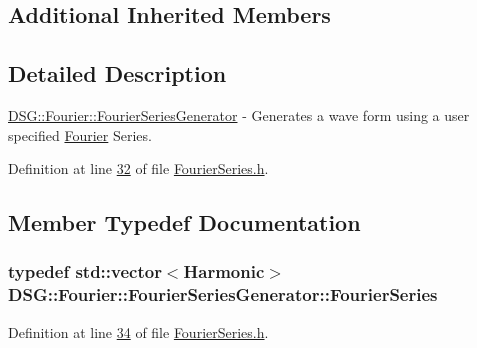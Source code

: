 \subsection*{Additional Inherited Members}


\subsection{Detailed Description}
\hyperlink{class_d_s_g_1_1_fourier_1_1_fourier_series_generator}{D\+S\+G\+::\+Fourier\+::\+Fourier\+Series\+Generator} -\/ Generates a wave form using a user specified \hyperlink{namespace_d_s_g_1_1_fourier}{Fourier} Series. 

Definition at line \hyperlink{_fourier_series_8h_source_l00032}{32} of file \hyperlink{_fourier_series_8h_source}{Fourier\+Series.\+h}.



\subsection{Member Typedef Documentation}
\hypertarget{class_d_s_g_1_1_fourier_1_1_fourier_series_generator_a32ffe02b67ac07db92ad41e3ee366c94}{
\subsubsection[{Fourier\+Series}]{\setlength{\rightskip}{0pt plus 5cm}typedef std\+::vector$<${\bf Harmonic}$>$ {\bf D\+S\+G\+::\+Fourier\+::\+Fourier\+Series\+Generator\+::\+Fourier\+Series}}}\label{class_d_s_g_1_1_fourier_1_1_fourier_series_generator_a32ffe02b67ac07db92ad41e3ee366c94}


Definition at line \hyperlink{_fourier_series_8h_source_l00034}{34} of file \hyperlink{_fourier_series_8h_source}{Fourier\+Series.\+h}.




